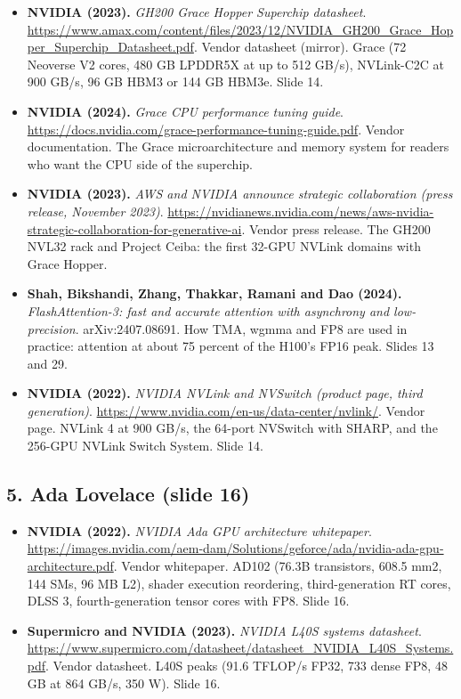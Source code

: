 \documentclass[11pt,letterpaper]{article}
\begin{document}
\begin{itemize}[leftmargin=1.2em,itemsep=3pt]
\item \textbf{NVIDIA (2023).} \textit{GH200 Grace Hopper Superchip datasheet}. \url{https://www.amax.com/content/files/2023/12/NVIDIA_GH200_Grace_Hopper_Superchip_Datasheet.pdf}. Vendor datasheet (mirror). Grace (72 Neoverse V2 cores, 480 GB LPDDR5X at up to 512 GB/s), NVLink-C2C at 900 GB/s, 96 GB HBM3 or 144 GB HBM3e. Slide 14.
\item \textbf{NVIDIA (2024).} \textit{Grace CPU performance tuning guide}. \url{https://docs.nvidia.com/grace-performance-tuning-guide.pdf}. Vendor documentation. The Grace microarchitecture and memory system for readers who want the CPU side of the superchip.
\item \textbf{NVIDIA (2023).} \textit{AWS and NVIDIA announce strategic collaboration (press release, November 2023)}. \url{https://nvidianews.nvidia.com/news/aws-nvidia-strategic-collaboration-for-generative-ai}. Vendor press release. The GH200 NVL32 rack and Project Ceiba: the first 32-GPU NVLink domains with Grace Hopper.
\item \textbf{Shah, Bikshandi, Zhang, Thakkar, Ramani and Dao (2024).} \textit{FlashAttention-3: fast and accurate attention with asynchrony and low-precision}. arXiv:2407.08691. How TMA, wgmma and FP8 are used in practice: attention at about 75 percent of the H100's FP16 peak. Slides 13 and 29.
\item \textbf{NVIDIA (2022).} \textit{NVIDIA NVLink and NVSwitch (product page, third generation)}. \url{https://www.nvidia.com/en-us/data-center/nvlink/}. Vendor page. NVLink 4 at 900 GB/s, the 64-port NVSwitch with SHARP, and the 256-GPU NVLink Switch System. Slide 14.
\end{itemize}
\subsection*{5. Ada Lovelace (slide 16)}
\begin{itemize}[leftmargin=1.2em,itemsep=3pt]\sloppy
\item \textbf{NVIDIA (2022).} \textit{NVIDIA Ada GPU architecture whitepaper}. \url{https://images.nvidia.com/aem-dam/Solutions/geforce/ada/nvidia-ada-gpu-architecture.pdf}. Vendor whitepaper. AD102 (76.3B transistors, 608.5 mm2, 144 SMs, 96 MB L2), shader execution reordering, third-generation RT cores, DLSS 3, fourth-generation tensor cores with FP8. Slide 16.
\item \textbf{Supermicro and NVIDIA (2023).} \textit{NVIDIA L40S systems datasheet}. \url{https://www.supermicro.com/datasheet/datasheet_NVIDIA_L40S_Systems.pdf}. Vendor datasheet. L40S peaks (91.6 TFLOP/s FP32, 733 dense FP8, 48 GB at 864 GB/s, 350 W). Slide 16.
\end{itemize}
\end{document}
